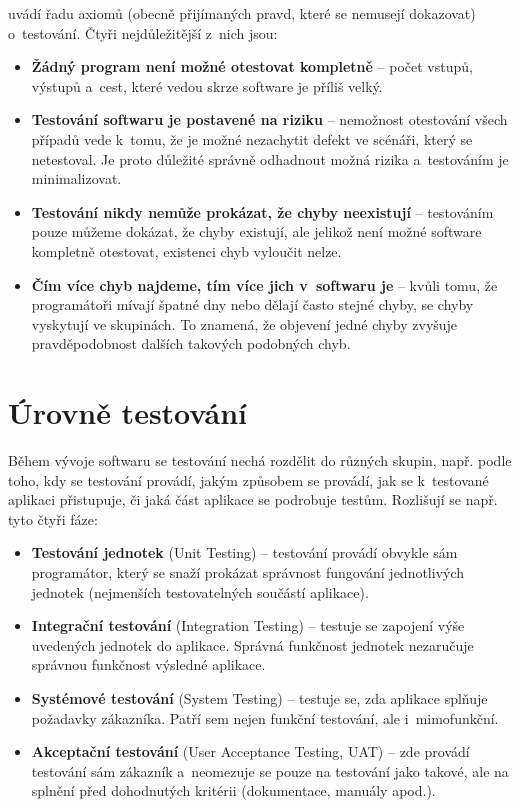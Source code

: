	\citep{Patton} uvádí řadu axiomů (obecně přijímaných pravd, které se nemusejí dokazovat) o~testování. Čtyři nejdůležitější z~nich jsou:
		\begin{itemize}
			\item \textbf{Žádný program není možné otestovat kompletně} -- počet vstupů, výstupů a~cest, které vedou skrze software je příliš velký.
			\item \textbf{Testování softwaru je postavené na riziku} -- nemožnost otestování všech případů vede k~tomu, že je možné nezachytit defekt ve scénáři, který se netestoval. Je proto důležité správně odhadnout možná rizika a~testováním je minimalizovat.
			\item \textbf{Testování nikdy nemůže prokázat, že chyby neexistují} -- testováním pouze můžeme dokázat, že chyby existují, ale jelikož není možné software kompletně otestovat, existenci chyb vyloučit nelze.
			\item \textbf{Čím více chyb najdeme, tím více jich v~softwaru je} -- kvůli tomu, že programátoři mívají špatné dny nebo dělají často stejné chyby, se chyby vyskytují ve skupinách. To znamená, že objevení jedné chyby zvyšuje pravděpodobnost dalších takových podobných chyb.
		\end{itemize}
		
		\section{Úrovně testování}
		Během vývoje softwaru se testování nechá rozdělit do různých skupin, např. podle toho, kdy se testování provádí, jakým způsobem se provádí, jak se k~testované aplikaci přistupuje, či jaká část aplikace se podrobuje testům. Rozlišují se např. tyto čtyři fáze:
			\begin{itemize}
				\item \textbf{Testování jednotek} (Unit Testing) -- testování provádí obvykle sám programátor, který se snaží prokázat správnost fungování jednotlivých jednotek (nejmenších testovatelných součástí aplikace).
				\item \textbf{Integrační testování} (Integration Testing) -- testuje se zapojení výše uvedených jednotek do aplikace. Správná funkčnost jednotek nezaručuje správnou funkčnost výsledné aplikace.
				\item \textbf{Systémové testování} (System Testing) -- testuje se, zda aplikace splňuje požadavky zákazníka. Patří sem nejen funkční testování, ale i~mimofunkční.
				\item \textbf{Akceptační testování} (User Acceptance Testing, UAT) -- zde provádí testování sám zákazník a~neomezuje se pouze na testování jako takové, ale na splnění před dohodnutých kritérii (dokumentace, manuály apod.).
			\end{itemize}
			

